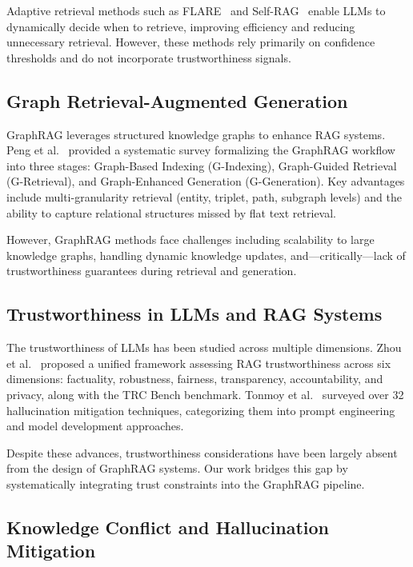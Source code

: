 \documentclass[11pt,a4paper]{article}
\begin{document}
Adaptive retrieval methods such as FLARE~\cite{jiang2023active} and Self-RAG~\cite{asai2024selfrag} enable LLMs to dynamically decide when to retrieve, improving efficiency and reducing unnecessary retrieval. However, these methods rely primarily on confidence thresholds and do not incorporate trustworthiness signals.

\subsection{Graph Retrieval-Augmented Generation}

GraphRAG leverages structured knowledge graphs to enhance RAG systems. Peng et al.~\cite{peng2024graphrag} provided a systematic survey formalizing the GraphRAG workflow into three stages: Graph-Based Indexing (G-Indexing), Graph-Guided Retrieval (G-Retrieval), and Graph-Enhanced Generation (G-Generation). Key advantages include multi-granularity retrieval (entity, triplet, path, subgraph levels) and the ability to capture relational structures missed by flat text retrieval.

However, GraphRAG methods face challenges including scalability to large knowledge graphs, handling dynamic knowledge updates, and---critically---lack of trustworthiness guarantees during retrieval and generation.

\subsection{Trustworthiness in LLMs and RAG Systems}

The trustworthiness of LLMs has been studied across multiple dimensions. Zhou et al.~\cite{zhou2024trustworthiness} proposed a unified framework assessing RAG trustworthiness across six dimensions: factuality, robustness, fairness, transparency, accountability, and privacy, along with the TRC Bench benchmark. Tonmoy et al.~\cite{tonmoy2024comprehensive} surveyed over 32 hallucination mitigation techniques, categorizing them into prompt engineering and model development approaches.

Despite these advances, trustworthiness considerations have been largely absent from the design of GraphRAG systems. Our work bridges this gap by systematically integrating trust constraints into the GraphRAG pipeline.

\subsection{Knowledge Conflict and Hallucination Mitigation}
\end{document}
